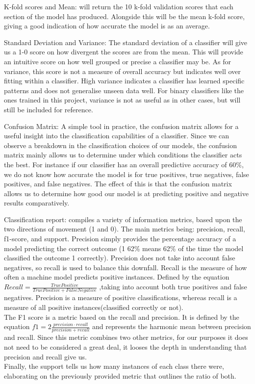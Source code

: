 \documentclass[11pt, a4paper]{article}
\begin{document}
K-fold scores and Mean: will return the 10 k-fold validation scores that each section of the model has produced. Alongside this will be the mean k-fold score, giving a good indication of how accurate the model is as an average.

Standard Deviation and Variance: The standard deviation of a classifier will give us a 1-0 score on how divergent the scores are from the mean. This will provide an intuitive score on how well grouped or precise a classifier may be. As for variance, this score is not a measure of overall accuracy but indicates well over fitting within a classifier. High variance indicates a classifier has learned specific patterns and does not generalise unseen data well. For binary classifiers like the ones trained in this project, variance is not as useful as in other cases, but will still be included for reference.

Confusion Matrix:
A simple tool in practice, the confusion matrix allows for a useful insight into the classification capabilities of a classifier. Since we can observe a breakdown in the classification choices of our models, the confusion matrix mainly allows us to determine under which conditions the classifier acts the best. For instance if our classifier has an overall predictive accuracy of 60\%, we do not know how accurate the model is for true positives, true negatives, false positives, and false negatives. The effect of this is that the confusion matrix allows us to determine how good our model is at predicting positive and negative results comparatively.

Classification report: compiles a variety of information metrics, based upon the two directions of movement (1 and 0). The main metrics being: precision, recall, f1-score, and support.
Precision simply provides the percentage accuracy of a model predicting the correct outcome (1 62\% means 62\% of the time the model classified the outcome 1 correctly). Precision does not take into account false negatives, so recall is used to balance this downfall.
Recall is the measure of how often a machine model predicts positive instances. Defined by the equation $Recall = \frac{TruePositive}{TruePositive+FalseNegative}$ ,taking into account both true positives and false negatives. Precision is a measure of positive classifications, whereas recall is a measure of all positive instances(classified correctly or not).\\
The F1 score is a metric based on the recall and precision. It is defined by the equation $f1 = 2 \frac{precision\cdot recall}{precision + recall}$ and represents the harmonic mean between precision and recall. Since this metric combines two other metrics, for our purposes it does not need to be considered a great deal, it looses the depth in understanding that precision and recall give us.\\
Finally, the support tells us how many instances of each class there were, elaborating on the previously provided metric that outlines the ratio of both.
\end{document}
